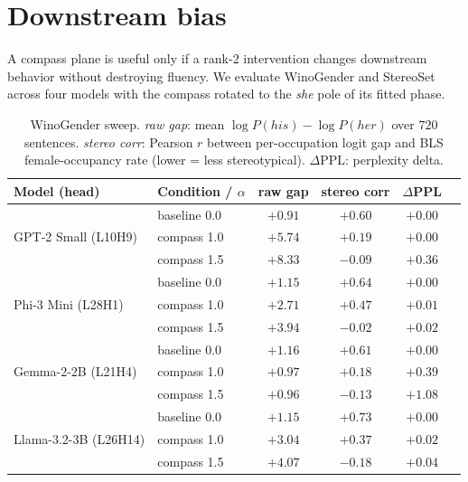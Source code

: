 \section{Downstream bias}
\label{sec:downstream}

A compass plane is useful only if a rank-$2$ intervention changes
downstream behavior without destroying fluency. We evaluate
WinoGender \citep{rudinger2018winogender,zhao2018winogender} and
StereoSet \citep{nadeem2021stereoset} across four models with the
compass rotated to the \emph{she} pole of its fitted phase.

\begin{table}[h]
\centering
\small
\caption{WinoGender sweep. \emph{raw gap}: mean
$\log P(\mathit{his}) - \log P(\mathit{her})$ over $720$ sentences.
\emph{stereo corr}: Pearson $r$ between per-occupation logit gap
and BLS female-occupancy rate (lower = less stereotypical).
$\Delta$PPL: perplexity delta.}
\label{tab:winogender}
\begin{tabular}{llcccc}
\toprule
Model (head) & Condition / $\alpha$ & raw gap & stereo corr & $\Delta$PPL \\
\midrule
\multirow{3}{*}{GPT-2 Small (L10H9)}
& baseline 0.0  & $+0.91$ & $+0.60$ & $+0.00$ \\
& compass 1.0   & $+5.74$ & $+0.19$ & $+0.00$ \\
& compass 1.5   & $+8.33$ & $-0.09$ & $+0.36$ \\
\midrule
\multirow{3}{*}{Phi-3 Mini (L28H1)}
& baseline 0.0  & $+1.15$ & $+0.64$ & $+0.00$ \\
& compass 1.0   & $+2.71$ & $+0.47$ & $+0.01$ \\
& compass 1.5   & $+3.94$ & $-0.02$ & $+0.02$ \\
\midrule
\multirow{3}{*}{Gemma-2-2B (L21H4)}
& baseline 0.0  & $+1.16$ & $+0.61$ & $+0.00$ \\
& compass 1.0   & $+0.97$ & $+0.18$ & $+0.39$ \\
& compass 1.5   & $+0.96$ & $-0.13$ & $+1.08$ \\
\midrule
\multirow{3}{*}{Llama-3.2-3B (L26H14)}
& baseline 0.0  & $+1.15$ & $+0.73$ & $+0.00$ \\
& compass 1.0   & $+3.04$ & $+0.37$ & $+0.02$ \\
& compass 1.5   & $+4.07$ & $-0.18$ & $+0.04$ \\
\bottomrule
\end{tabular}
\end{table}

